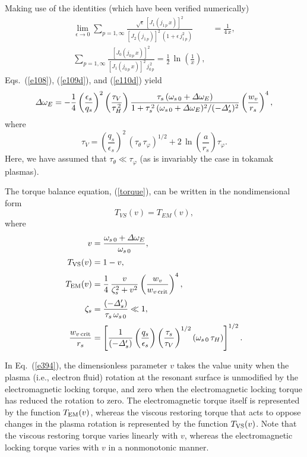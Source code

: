 \documentclass[12pt,prb,aps]{revtex4-1}
\begin{document}
Making use of the identities (which have been verified numerically)
\begin{align}\label{e417a}
\lim_{\epsilon\rightarrow 0}\sum_{p=1,\infty} \frac{\sqrt{\epsilon}\,[J_1(j_{1\,p}\,x)]^{2}}{[J_2(j_{1\,p})]^2\,(1+\epsilon\,j_{1\,p}^2)}
&=\frac{1}{4\,x},\\[0.5ex]
\sum_{p=1,\infty} \frac{[J_0(j_{0\,p}\,x)]^2}{[J_1(j_{0\,p}\,x)]^2\,j_{0\,p}^{\,2}} =\frac{1}{2}\,\ln\!\left(\frac{1}{x}\right),\label{e418a}
\end{align}
Eqs.~(\ref{e108}), (\ref{e109d}), and (\ref{e110d}) yield
\begin{equation}\label{torque}
{\mit\Delta}\omega_E =- \frac{1}{4}\left(\frac{\epsilon_s}{q_s}\right)^2\left(\frac{\tau_V}{\tau_H^{\,2}}\right)\frac{\tau_s\,(\omega_{s\,0}+{\mit\Delta}\omega_E)}{1+\tau_s^{\,2}\,(\omega_{s\,0}+{\mit\Delta}\omega_E)^2/(-{\mit\Delta}_s')^2}\left(\frac{w_v}{r_s}\right)^4,
\end{equation}
where
\begin{equation}
\tau_V = \left(\frac{q_s}{\epsilon_s}\right)^2\,(\tau_\theta\,\tau_\varphi)^{1/2} + 2\,\ln\!\left(\frac{a}{r_s}\right)\tau_\varphi.
\end{equation}
Here, we have assumed that $\tau_\theta\ll \tau_\varphi$ (as is invariably the case in tokamak plasmas). 

The torque balance equation, (\ref{torque}), can be written in the nondimensional form 
\begin{equation}\label{e394}
T_{VS}(v)= T_{EM}(v),
\end{equation}
where
\begin{align}
v&=\frac{\omega_{s\,0}+{\mit\Delta}\omega_E}{\omega_{s\,0}},\\[0.5ex]
T_{\rm VS}(v) &= 1- v,\\[0.5ex]
T_{\rm EM}(v) &= \frac{1}{4}\,\frac{v}{\zeta_s^{2}+v^2}
\left(\frac{w_v}{w_{v\,{\rm crit}}}\right)^4,\\[0.5ex]
\zeta_s &= \frac{(-{\mit\Delta}'_s)}{\tau_s\,\omega_{s\,0}}\ll 1,\\[0.5ex]
\frac{w_{v\,{\rm crit}}}{r_s}&= \left[\frac{1}{(-{\mit\Delta}'_s)}\left(\frac{q_s}{\epsilon_s}\right)\left(\frac{\tau_s}{\tau_V}\right)^{1/2}(\omega_{s\,0}\,\tau_H)\right]^{1/2}.
\end{align}

In Eq.~(\ref{e394}), the dimensionless
parameter $v$ takes the value unity when the plasma (i.e., electron fluid) rotation at the resonant surface is unmodified by
the electromagnetic locking torque, and zero when the electromagnetic locking torque has reduced the rotation to zero. The electromagnetic torque itself
is represented  by the function $T_{\rm EM}(v)$, whereas the viscous restoring torque that acts to oppose changes in the plasma rotation is represented
by the function $T_{\rm VS}(v)$. Note that the viscous restoring torque varies linearly with $v$,
whereas the electromagnetic locking torque varies with $v$ in a nonmonotonic manner.
\end{document}
